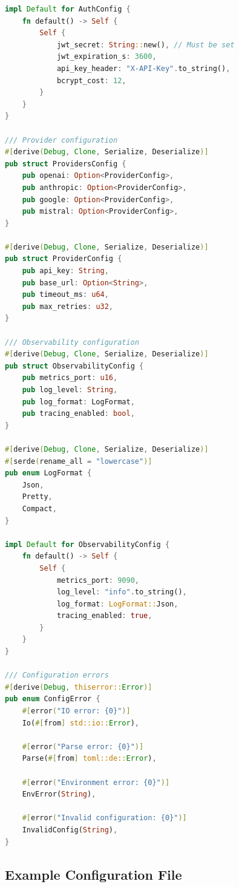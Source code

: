 \documentclass[12pt,a4paper,twoside]{report}
\begin{document}
\begin{lstlisting}[language=Rust,caption={Configuration Types - crates/gaussmeridian-config/src/lib.rs}]
impl Default for AuthConfig {
    fn default() -> Self {
        Self {
            jwt_secret: String::new(), // Must be set
            jwt_expiration_s: 3600,
            api_key_header: "X-API-Key".to_string(),
            bcrypt_cost: 12,
        }
    }
}

/// Provider configuration
#[derive(Debug, Clone, Serialize, Deserialize)]
pub struct ProvidersConfig {
    pub openai: Option<ProviderConfig>,
    pub anthropic: Option<ProviderConfig>,
    pub google: Option<ProviderConfig>,
    pub mistral: Option<ProviderConfig>,
}

#[derive(Debug, Clone, Serialize, Deserialize)]
pub struct ProviderConfig {
    pub api_key: String,
    pub base_url: Option<String>,
    pub timeout_ms: u64,
    pub max_retries: u32,
}

/// Observability configuration
#[derive(Debug, Clone, Serialize, Deserialize)]
pub struct ObservabilityConfig {
    pub metrics_port: u16,
    pub log_level: String,
    pub log_format: LogFormat,
    pub tracing_enabled: bool,
}

#[derive(Debug, Clone, Serialize, Deserialize)]
#[serde(rename_all = "lowercase")]
pub enum LogFormat {
    Json,
    Pretty,
    Compact,
}

impl Default for ObservabilityConfig {
    fn default() -> Self {
        Self {
            metrics_port: 9090,
            log_level: "info".to_string(),
            log_format: LogFormat::Json,
            tracing_enabled: true,
        }
    }
}

/// Configuration errors
#[derive(Debug, thiserror::Error)]
pub enum ConfigError {
    #[error("IO error: {0}")]
    Io(#[from] std::io::Error),
    
    #[error("Parse error: {0}")]
    Parse(#[from] toml::de::Error),
    
    #[error("Environment error: {0}")]
    EnvError(String),
    
    #[error("Invalid configuration: {0}")]
    InvalidConfig(String),
}
\end{lstlisting}

\subsection{Example Configuration File}
\end{document}
